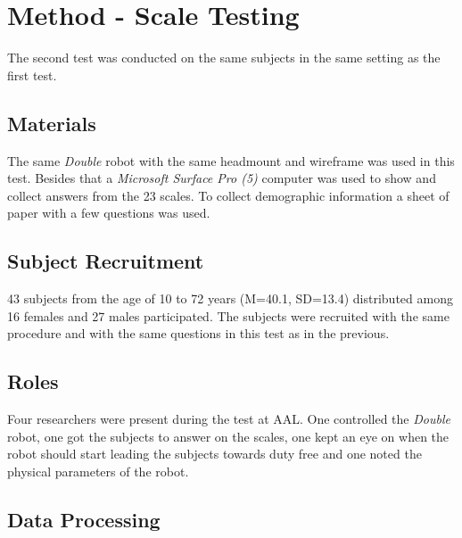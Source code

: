\section{{\color{red}Method - Scale Testing}}
\label{MethodScaleTesting}
The second test was conducted on the same subjects in the same setting as the first test.
%
\subsection{Materials}
\label{MaterialsScaleTesting}
%
The same \textit{Double} robot with the same headmount and wireframe was used in this test. Besides that a \textit{Microsoft Surface Pro (5)} computer was used to show and collect answers from the 23 scales. To collect demographic information a sheet of paper with a few questions was used.
\subsection{Subject Recruitment}
43 subjects from the age of 10 to 72 years (M=40.1, SD=13.4) distributed among 16 females and 27 males participated. The subjects were recruited with the same procedure and with the same questions in this test as in the previous. 
\subsection{Roles}
Four researchers were present during the test at AAL. One controlled the \textit{Double} robot, one got the subjects to answer on the scales, one kept an eye on when the robot should start leading the subjects towards duty free and one noted the physical parameters of the robot.
\subsection{{\color{red}Data Processing}}

